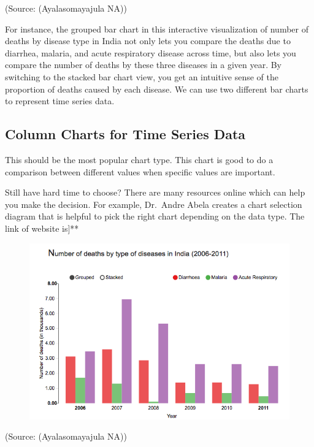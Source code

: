 \documentclass[]{book}
\theoremstyle{definition}
\theoremstyle{definition}
\theoremstyle{definition}
\theoremstyle{remark}
\begin{document}
(Source: (Ayalasomayajula NA))

For instance, the grouped bar chart in this interactive visualization of
number of deaths by disease type in India not only lets you compare the
deaths due to diarrhea, malaria, and acute respiratory disease across
time, but also lets you compare the number of deaths by these three
diseases in a given year. By switching to the stacked bar chart view,
you get an intuitive sense of the proportion of deaths caused by each
disease. We can use two different bar charts to represent time series
data.

\subsection{Column Charts for Time Series
Data}\label{column-charts-for-time-series-data}

This should be the most popular chart type. This chart is good to do a
comparison between different values when specific values are important.

Still have hard time to choose? There are many resources online which
can help you make the decision. For example, Dr.~Andre Abela creates a
chart selection diagram that is helpful to pick the right chart
depending on the data type. The link of website is{]}**

\begin{figure}
\centering
\includegraphics{images/aya-bar1.png}
\caption{}
\end{figure}

(Source: (Ayalasomayajula NA))
\end{document}
